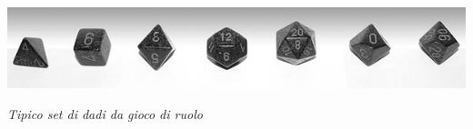 

\vfill

\begin{center}
\includegraphics[keepaspectratio,width=0.95\linewidth]{immagini/dice.png}

\medskip

\emph{Tipico set di dadi da gioco di ruolo}
\end{center}

\pagebreak
